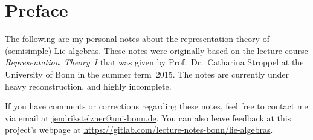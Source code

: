 \chapter*{Preface}

The following are my personal notes about the representation theory of (semisimple) Lie algebras.
These notes were originally based on the lecture course \emph{Representation~Theory~I} that was given by Prof.~Dr.~Catharina Stroppel at the University of Bonn in the summer term~2015.
The notes are currently under heavy reconstruction, and highly incomplete.

If you have comments or corrections regarding these notes, feel free to contact me via email at \href{mailto:jendrikstelzner@uni-bonn.de}{jendrikstelzner@uni-bonn.de}.
You can also leave feedback at this project’s webpage at \url{https://gitlab.com/lecture-notes-bonn/lie-algebras}.





